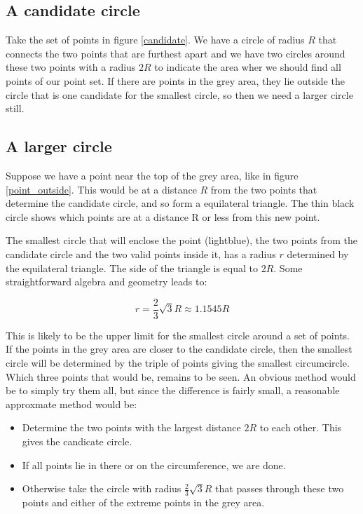 \documentclass[onecolumn]{article}
\begin{document}
\subsection*{A candidate circle}
Take the set of points in figure \ref{candidate}. We have a circle of radius $R$ that connects the two points that
are furthest apart and we have two circles around these two points with a radius $2R$ to indicate the area wher
we should find all points of our point set. If there are points in the grey area, they lie outside the
circle that is one candidate for the smallest circle, so then we need a larger circle still.

\subsection*{A larger circle}
Suppose we have a point near the top of the grey area, like in figure \ref{point_outside}. This would be at a distance $R$
from the two points that determine the candidate circle, and so form a equilateral triangle. The thin black circle
shows which points are at a distance R or less from this new point.

The smallest circle that will enclose the point (lightblue), the two points from the candidate circle and the two
valid points inside it, has a radius $r$ determined by the equilateral triangle. The side of the triangle is equal to $2R$.
Some straightforward algebra and geometry leads to:

\begin{equation}
    r = \frac{2}{3} \sqrt{3} R \approx 1.1545 R
\end{equation}

This is likely to be the upper limit for the smallest circle around a set of points. If the points in the grey
area are closer to the candidate circle, then the smallest circle will be determined by the triple of points giving
the smallest circumcircle. Which three points that would be, remains to be seen. An obvious method would be to simply
try them all, but since the difference is fairly small, a reasonable approxmate method would be:
\begin{itemize}
\item
Determine the two points with the largest distance $2R$ to each other. This gives the candicate circle.
\item
If all points lie in there or on the circumference, we are done.
\item
Otherwise take the circle with radius $\frac{2}{3} \sqrt{3} R$ that passes through these two points and either of the
extreme points in the grey area.
\end{itemize}
\end{document}
